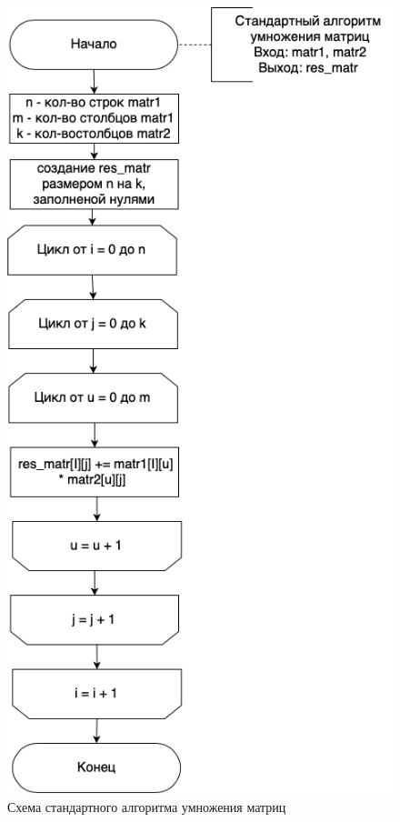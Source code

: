 \documentclass[a4paper,14pt, unknownkeysallowed]{extreport}
\begin{document}
\begin{figure}[h]
	\centering
	\includegraphics[scale=0.7]{img/classical_alg_scheme.png}
	\caption{Схема стандартного алгоритма умножения матриц}
	\label{fig:сlassic}
\end{figure}

\clearpage
\end{document}
